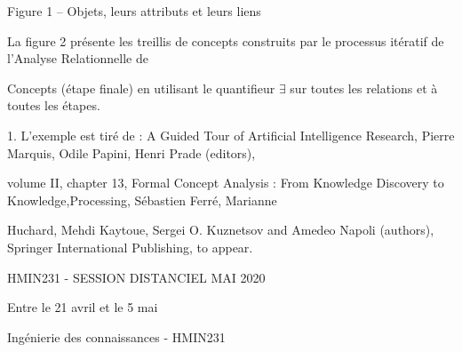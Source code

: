 \documentclass[a4paper,portrait,12pt]{article}
\begin{document}
\begin{flushleft}
Figure 1 -- Objets, leurs attributs et leurs liens
\end{flushleft}





\begin{flushleft}
La figure 2 présente les treillis de concepts construits par le processus itératif de l'Analyse Relationnelle de
\end{flushleft}


\begin{flushleft}
Concepts (étape finale) en utilisant le quantifieur $\exists$ sur toutes les relations et à toutes les étapes.
\end{flushleft}





\begin{flushleft}
1. L'exemple est tiré de : A Guided Tour of Artificial Intelligence Research, Pierre Marquis, Odile Papini, Henri Prade (editors),
\end{flushleft}


\begin{flushleft}
volume II, chapter 13, Formal Concept Analysis : From Knowledge Discovery to Knowledge,Processing, Sébastien Ferré, Marianne
\end{flushleft}


\begin{flushleft}
Huchard, Mehdi Kaytoue, Sergei O. Kuznetsov and Amedeo Napoli (authors), Springer International Publishing, to appear.
\end{flushleft}





\begin{flushleft}
HMIN231 - SESSION DISTANCIEL MAI 2020
\end{flushleft}





\begin{flushleft}
Entre le 21 avril et le 5 mai
\end{flushleft}





\begin{flushleft}
\newpage
Ingénierie des connaissances - HMIN231
\end{flushleft}
\end{document}
